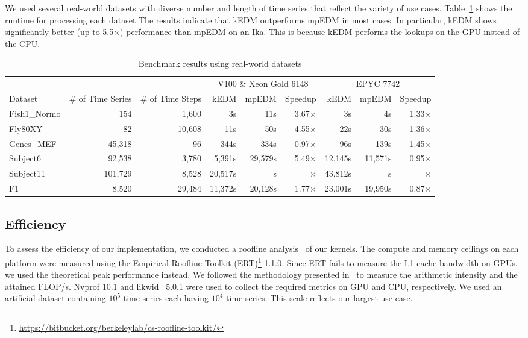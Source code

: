 \documentclass[sigconf]{acmart}
\begin{document}
We used several real-world datasets with diverse number and length of time
series that reflect the variety of use cases.
Table~\ref{tbl:real-world} shows the runtime for processing each dataset The
results indicate that kEDM outperforms mpEDM in most cases. In particular,
kEDM shows significantly better (up to 5.5$\times$) performance than mpEDM on
an Ika\@. This is because kEDM performs the lookups on the GPU instead of the
CPU\@.

\begin{table}
\centering
\caption{Benchmark results using real-world datasets}%
\label{tbl:real-world}
\begin{tabular}{@{}lrrrrrrrr@{}}
\toprule
             & \multicolumn{1}{c}{} & \multicolumn{1}{c}{} & \multicolumn{3}{c}{V100 \& Xeon Gold 6148 } & \multicolumn{3}{c}{EPYC 7742} \\ \cmidrule(l){4-6}  \cmidrule(l){7-9}
Dataset      & \multicolumn{1}{c}{\# of Time Series} & \multicolumn{1}{c}{\# of Time Steps} & kEDM & mpEDM & Speedup & kEDM & mpEDM & Speedup \\ \midrule
Fish1\_Normo &  154    & 1,600  &      3s &     11s & 3.67$\times$ &      3s &      4s & 1.33$\times$ \\
Fly80XY      &  82     & 10,608 &     11s &     50s & 4.55$\times$ &     22s &     30s & 1.36$\times$ \\
Genes\_MEF   &  45,318 & 96     &    344s &    334s & 0.97$\times$ &     96s &    139s & 1.45$\times$ \\
Subject6     &  92,538 & 3,780  &  5,391s & 29,579s & 5.49$\times$ & 12,145s & 11,571s & 0.95$\times$ \\
Subject11    & 101,729 & 8,528  & 20,517s &       s &     $\times$ & 43,812s &       s &     $\times$ \\
F1           &  8,520  & 29,484 & 11,372s & 20,128s & 1.77$\times$ & 23,001s & 19,950s & 0.87$\times$ \\ \bottomrule
\end{tabular}
\end{table}

\subsection{Efficiency}

To assess the efficiency of our implementation, we conducted a roofline
analysis~\cite{Williams2008} of our kernels. The compute and memory ceilings
on each platform were measured using the Empirical Roofline Toolkit (ERT)\footnote{\url{https://bitbucket.org/berkeleylab/cs-roofline-toolkit/}} 1.1.0.
Since ERT fails to measure the L1 cache bandwidth on GPUs, we used the
theoretical peak performance instead. We followed the methodology presented
in~\cite{Yang2020a,Yang2020b} to measure the arithmetic intensity and the
attained FLOP/s. Nvprof 10.1 and likwid~\cite{Treibig2010} 5.0.1 were used to
collect the required metrics on GPU and CPU, respectively.
We used an artificial dataset containing $10^5$ time series each having $10^4$
time series. This scale reflects our largest use case.
\end{document}
